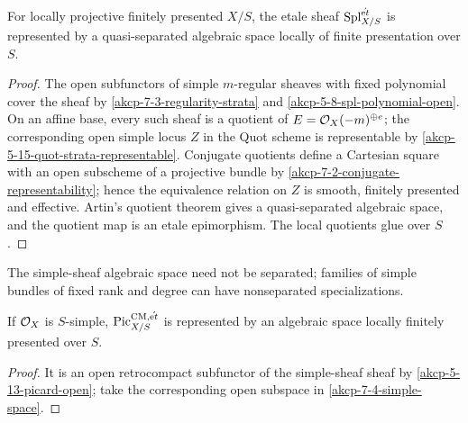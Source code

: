 \begin{theorem}
\label{akcp-7-4-simple-space}
For locally projective finitely presented $X/S$, the etale sheaf
$\operatorname{Spl}^{\acute{\mathrm et}}_{X/S}$ is represented by a quasi-separated
algebraic space locally of finite presentation over $S$.
\end{theorem}
\begin{proof}
The open subfunctors of simple $m$-regular sheaves with fixed polynomial cover
the sheaf by \cref{akcp-7-3-regularity-strata} and
\cref{akcp-5-8-spl-polynomial-open}.  On an affine base, every such sheaf is a
quotient of $E=\mathcal O_X(-m)^{\oplus e}$; the corresponding open simple locus
$Z$ in the Quot scheme is representable by
\cref{akcp-5-15-quot-strata-representable}.  Conjugate quotients define a
Cartesian square with an open subscheme of a projective bundle by
\cref{akcp-7-2-conjugate-representability}; hence the equivalence relation on
$Z$ is smooth, finitely presented and effective.  Artin's quotient theorem
gives a quasi-separated algebraic space, and the quotient map is an etale
epimorphism.  The local quotients glue over $S$.
\end{proof}

\begin{remark}
\label{akcp-7-5-nonseparated}
The simple-sheaf algebraic space need not be separated; families of simple
bundles of fixed rank and degree can have nonseparated specializations.
\end{remark}

\begin{corollary}
\label{akcp-7-6-picard-space}
If $\mathcal O_X$ is $S$-simple, $\operatorname{Pic}^{\mathrm{CM},\acute{\mathrm et}}_{X/S}$ is
represented by an algebraic space locally finitely presented over $S$.
\end{corollary}
\begin{proof}
It is an open retrocompact subfunctor of the simple-sheaf sheaf by
\cref{akcp-5-13-picard-open}; take the corresponding open subspace in
\cref{akcp-7-4-simple-space}.
\end{proof}

